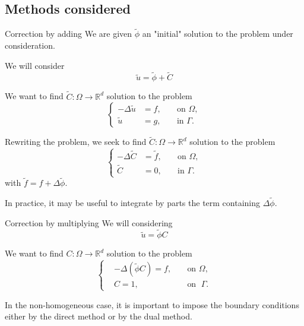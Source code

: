 \documentclass[compress,10pt,xcolor={table,dvipsnames},t]{beamer}
\begin{document}
	\subsection{Methods considered}
	
	\begin{frame}{Correction by adding}
		We are given $\tilde{\phi}$ an "initial" solution to the problem under consideration.
		
		We will consider
		\begin{equation*}
			\tilde{u}=\tilde{\phi}+\tilde{C}
		\end{equation*}
	
		We want to find $\tilde{C}: \Omega \rightarrow \mathbb{R}^d$ solution to the problem
		\begin{equation*}
			\left\{\begin{aligned}
				-\Delta \tilde{u}&=f, \; &&\text{on } \Omega, \\
				\tilde{u}&=g, \; &&\text{in } \Gamma.
			\end{aligned}\right.
		\end{equation*}
	
		Rewriting the problem, we seek to find $\tilde{C}: \Omega \rightarrow \mathbb{R}^d$ solution to the problem
		\begin{equation*}
			\left\{\begin{aligned}
				-\Delta \tilde{C}&=\tilde{f}, \; &&\text{on } \Omega, \\
				\tilde{C}&=0, \; &&\text{in } \Gamma.
			\end{aligned}\right. %
		\end{equation*}
		with $\tilde{f}=f+\Delta\tilde{\phi}$.

		In practice, it may be useful to integrate by parts the term containing $\Delta \tilde{\phi}$.
	\end{frame}

	\begin{frame}{Correction by multiplying}
		We will considering 
		\begin{equation*}
			\tilde{u}=\tilde{\phi}C
		\end{equation*}
		
		We want to find $C: \Omega \rightarrow \mathbb{R}^d$ solution to the problem
		\begin{equation*}
			\left\{\begin{aligned}
				&-\Delta (\tilde{\phi}C)=f, \; &&\text{on } \Omega, \\
				&C=1, \; &&\text{on } \; \Gamma.
			\end{aligned}\right.
		\end{equation*}
		
		In the non-homogeneous case, it is important to impose the boundary conditions either by the direct method or by the dual method.
	\end{frame}
\end{document}
